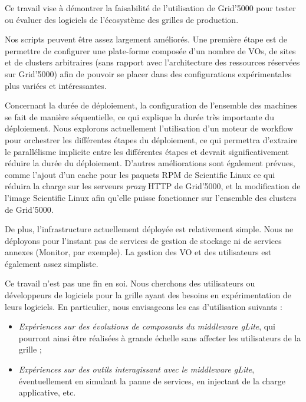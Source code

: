 \documentclass[a4paper,11pt]{article}
\begin{document}
Ce travail vise à démontrer la faisabilité de l'utilisation de Grid'5000 pour
tester ou évaluer des logiciels de l'écosystème des grilles de production.

Nos scripts peuvent être assez largement améliorés. Une première étape est de
permettre de configurer une plate-forme composée d'un nombre de VOs, de sites
et de clusters arbitraires (sans rapport avec l'architecture des ressources
réservées sur Grid'5000) afin de pouvoir se placer dans des configurations
expérimentales plus variées et intéressantes.

Concernant la durée de déploiement, la configuration de l'ensemble des machines
se fait de manière séquentielle, ce qui explique la durée très importante du
déploiement. Nous explorons actuellement l'utilisation d'un moteur de workflow
pour orchestrer les différentes étapes du déploiement, ce qui permettra
d'extraire le parallélisme implicite entre les différentes étapes et devrait
significativement réduire la durée du déploiement. D'autres améliorations sont
également prévues, comme l'ajout d'un cache pour les paquets RPM de Scientific
Linux ce qui réduira la charge sur les serveurs \textsl{proxy} HTTP de
Grid'5000, et la modification de l'image Scientific Linux afin qu'elle puisse
fonctionner sur l'ensemble des clusters de Grid'5000.

De plus, l'infrastructure actuellement déployée est relativement simple. Nous
ne déployons pour l'instant pas de services de gestion de stockage ni de
services annexes (Monitor, par exemple). La gestion des VO et des utilisateurs
est également assez simpliste.

Ce travail n'est pas une fin en soi. Nous cherchons des utilisateurs ou
développeurs de logiciels pour la grille ayant des besoins en expérimentation
de leurs logiciels. En particulier, nous envisageons les cas d'utilisation
suivants :

\begin{itemize}

\item \textit{Expériences sur des évolutions de composants du middleware
	gLite}, qui pourront ainsi être réalisées à grande échelle sans
	affecter les utilisateurs de la grille ;

\item \textit{Expériences sur des outils interagissant avec le middleware
	gLite}, éventuellement en simulant la panne de services, en injectant
	de la charge applicative, etc.

\end{itemize}
\end{document}
